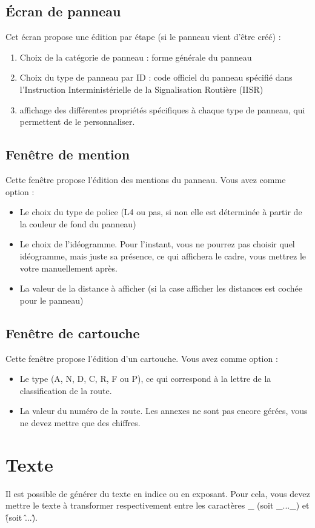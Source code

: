 \documentclass[a4paper, 12pt]{report}
\begin{document}
\subsection{Écran de panneau}
Cet écran propose une édition par étape (si le panneau vient d'être créé) :
\begin{enumerate}
	\item Choix de la catégorie de panneau : forme générale du panneau
	\item Choix du type de panneau par ID : code officiel du panneau spécifié dans l'Instruction Interministérielle de la Signalisation Routière (IISR)
	\item affichage des différentes propriétés spécifiques à chaque type de panneau, qui permettent de le personnaliser.
\end{enumerate}

\subsection{Fenêtre de mention}
Cette fenêtre propose l'édition des mentions du panneau. 
Vous avez comme option :
\begin{itemize}
	\item Le choix du type de police (L4 ou pas, si non elle est déterminée à partir de la couleur de fond du panneau)
	\item Le choix de l'idéogramme. Pour l'instant, vous ne pourrez pas choisir quel idéogramme, mais juste sa présence, ce qui affichera le cadre, vous mettrez le votre manuellement après.
	\item La valeur de la distance à afficher (si la case \og afficher les distances \fg est cochée pour le panneau)
\end{itemize}

\subsection{Fenêtre de cartouche}
Cette fenêtre propose l'édition d'un cartouche.
Vous avez comme option :
\begin{itemize}
	\item Le type (A, N, D, C, R, F ou P), ce qui correspond à la lettre de la classification de la route.
	\item La valeur du numéro de la route. Les annexes ne sont pas encore gérées, vous ne devez mettre que des chiffres.
\end{itemize}

\section{Texte}
Il est possible de générer du texte en indice ou en exposant. Pour cela, vous devez mettre le texte à transformer respectivement entre les caractères \_ (soit \_...\_) et \^ (soit \^...\^).
\end{document}
